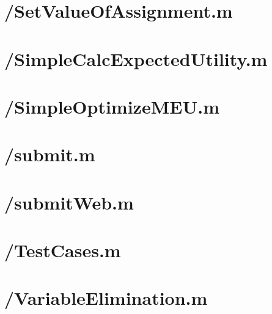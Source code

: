 \documentclass{article}
\begin{document}
\section{/SetValueOfAssignment.m}

\section{/SimpleCalcExpectedUtility.m}

\section{/SimpleOptimizeMEU.m}

\section{/submit.m}

\section{/submitWeb.m}

\section{/TestCases.m}

\section{/VariableElimination.m}

\end{document}
